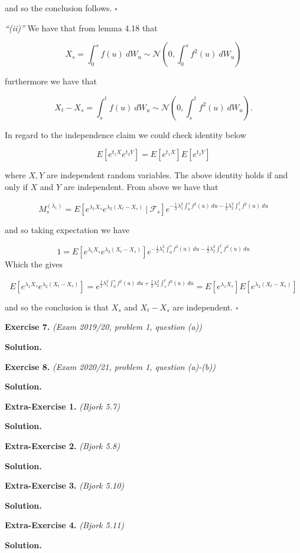 \documentclass[
]{article}
\begin{document}
and so the conclusion follows. \(\square\)

\emph{``(ii)''} We have that from lemma 4.18 that

\[
X_s=\int_0^sf(u)\ dW_u\sim \mathcal{N}\left(0,\int_0^sf^2(u)\ dW_u\right)
\]

furthermore we have that

\[
X_t-X_s=\int_s^tf(u)\ dW_u\sim \mathcal{N}\left(0,\int_s^tf^2(u)\ dW_u\right).
\]

In regard to the independence claim we could check identity below

\[
E[e^{t_1X}e^{t_2 Y}]=E[e^{t_1X}]E[e^{t_2Y}]
\]

where \(X,Y\) are independent random variables. The above identity holds
if and only if \(X\) and \(Y\) are independent. From above we have that

\[
M_s^{(\lambda_1)}=E[e^{\lambda_1X_s}e^{\lambda_2(X_t-X_s)}\ \vert\ \mathcal{F}_s]e^{-\frac{1}{2}\lambda_1^2\int_0^s f^2(u)\ du-\frac{1}{2}\lambda_2^2\int_s^t f^2(u)\ du}
\]

and so taking expectation we have

\[
1=E[e^{\lambda_1X_s}e^{\lambda_2(X_t-X_s)}]e^{-\frac{1}{2}\lambda_1^2\int_0^s f^2(u)\ du-\frac{1}{2}\lambda_2^2\int_s^t f^2(u)\ du}
\] Which the gives

\[
E[e^{\lambda_1X_s}e^{\lambda_2(X_t-X_s)}]=e^{\frac{1}{2}\lambda_1^2\int_0^s f^2(u)\ du+\frac{1}{2}\lambda_2^2\int_s^t f^2(u)\ du}=E[e^{\lambda_1X_s}]E[e^{\lambda_2(X_t-X_s)}]
\]

and so the conclusion is that \(X_s\) and \(X_t-X_s\) are independent.
\(\square\)

\textbf{Exercise 7.} \emph{(Exam 2019/20, problem 1, question (a))}

\textbf{Solution.}

\textbf{Exercise 8.} \emph{(Exam 2020/21, problem 1, question (a)-(b))}

\textbf{Solution.}

\textbf{Extra-Exercise 1.} \emph{(Bjork 5.7)}

\textbf{Solution.}

\textbf{Extra-Exercise 2.} \emph{(Bjork 5.8)}

\textbf{Solution.}

\textbf{Extra-Exercise 3.} \emph{(Bjork 5.10)}

\textbf{Solution.}

\textbf{Extra-Exercise 4.} \emph{(Bjork 5.11)}

\textbf{Solution.}
\end{document}
